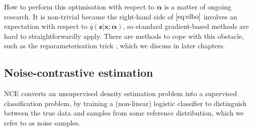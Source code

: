 \documentclass[11pt, oneside]{article}
\newcommand{\alphab}{{\boldsymbol{\alpha}}}
\newcommand{\x}{{\mathbf x}}
\newcommand{\z}{{\mathbf z}}
\theoremstyle{definition}
\begin{document}
How to perform this optimisation with respect to $\alphab$ is a matter of ongoing research. It is non-trivial because the right-hand side of $\ref{eq:elbo}$ involves an expectation with respect to $q(\z|\x; \alphab)$, so standard gradient-based methods are hard to straightforwardly apply. There are methods to cope with this obstacle, such as the reparameterisation trick \citep{kingma2015variational}, which we discuss in later chapters. 
\subsection{Noise-contrastive estimation}
\label{sec:nce}
NCE converts an unsupervised density estimation problem into a supervised classification problem, by training a (non-linear) logistic classifier to distinguish between the true data and samples from some reference distribution, which we refer to as noise samples.
\end{document}
